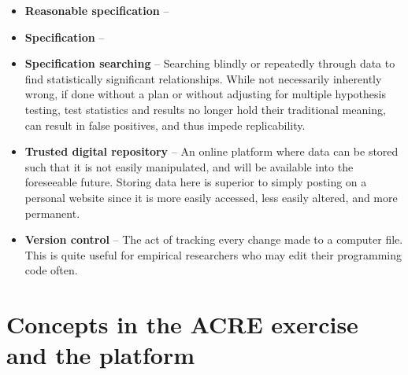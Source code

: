 \documentclass[
]{book}
\begin{document}
\begin{itemize}
\item
  \textbf{Reasonable specification} --
\item
  \textbf{Specification} --
\item
  \textbf{Specification searching} -- Searching blindly or repeatedly through data to find statistically significant relationships. While not necessarily inherently wrong, if done without a plan or without adjusting for multiple hypothesis testing, test statistics and results no longer hold their traditional meaning, can result in false positives, and thus impede replicability.\\
\item
  \textbf{Trusted digital repository} -- An online platform where data can be stored such that it is not easily manipulated, and will be available into the foreseeable future. Storing data here is superior to simply posting on a personal website since it is more easily accessed, less easily altered, and more permanent.\\
\item
  \textbf{Version control} -- The act of tracking every change made to a computer file. This is quite useful for empirical researchers who may edit their programming code often.
\end{itemize}

\hypertarget{concepts-in-the-acre-exercise-and-the-platform}{%
\section{Concepts in the ACRE exercise and the platform}\label{concepts-in-the-acre-exercise-and-the-platform}}
\end{document}
